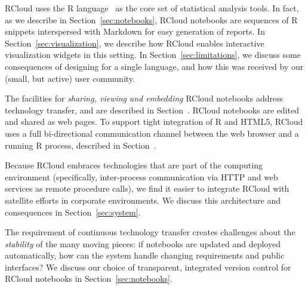 RCloud uses the R language~\cite{RCoreTeam:2013:R} as the core set
of statistical analysis tools. In fact, as we describe in
Section~\ref{sec:notebooks}, RCloud notebooks are sequences of R snippets
interspersed with Markdown for easy generation of reports. In
Section~\ref{sec:visualization}, we describe how RCloud enables
interactive visualization widgets in this setting. In
Section~\ref{sec:limitations}, we discuss some consequences of
designing for a single language, and how this was received by
our (small, but active) user community.

%

The facilities for \emph{sharing, viewing and embedding} RCloud
notebooks address technology transfer, and are described in
Section~. RCloud notebooks are edited and shared as web
pages. To support tight integration of R and HTML5, RCloud uses a
full bi-directional communication channel between the web browser
and a running R process, described in Section~.

Because RCloud embraces technologies that are part of the computing
environment (specifically, inter-process communication via HTTP and
web services as remote procedure calls), we find it easier to
integrate RCloud with satellite efforts in corporate environments.
We discuss this architecture and consequences in Section~\ref{sec:system}.

The requirement of continuous technology transfer creates challenges
about the \emph{stability} of the many moving pieces: if notebooks are
updated and deployed automatically, how can the system handle
changing requirements and public interfaces? We discuss our choice of
transparent, integrated version control for RCloud notebooks in 
Section~\ref{sec:notebooks}.



